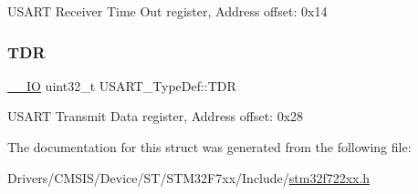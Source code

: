 U\+S\+A\+RT Receiver Time Out register, Address offset\+: 0x14 \mbox{\label{struct_u_s_a_r_t___type_def_a315ab2fb3869668e7c5c12e8204efe10}} 
\subsubsection{\texorpdfstring{TDR}{TDR}}
{\footnotesize\ttfamily \mbox{\hyperlink{core__sc300_8h_aec43007d9998a0a0e01faede4133d6be}{\+\_\+\+\_\+\+IO}} uint32\+\_\+t U\+S\+A\+R\+T\+\_\+\+Type\+Def\+::\+T\+DR}

U\+S\+A\+RT Transmit Data register, Address offset\+: 0x28 

The documentation for this struct was generated from the following file\+:\begin{DoxyCompactItemize}
\item 
Drivers/\+C\+M\+S\+I\+S/\+Device/\+S\+T/\+S\+T\+M32\+F7xx/\+Include/\mbox{\hyperlink{stm32f722xx_8h}{stm32f722xx.\+h}}\end{DoxyCompactItemize}
